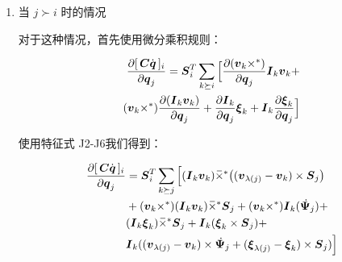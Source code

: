 \documentclass[letterpaper, 10 pt, conference]{ieeetran}  %
\begin{document}
{\begin{enumerate}
使用 $\B_{i}$ 的定义 (方程~\ref{bl_term_defn})，并对索引 $k$ 求和，我们得到：

   \begin{equation}
      \begin{aligned}
         \frac{\partial  [\,\C \qd\,]_{i}}{\partial \q_{j}} =     \Phibar_{i}^{T}  \Big[  2 \B_{i}^{C} \Psibardot_{j}  +\I_{i}^{C} \v_{\lambda(j)} \times \Psibardot_{j}   + \\
         \I_{i}^{C} \xibar_{\lambda(j)} \times \Phibar_{j}  \Big]  
        \label{partial_Cqdot_5}
      \end{aligned}
\end{equation}


 \item 当 $j \succ i $ 时的情况
 
 对于这种情况，首先使用微分乘积规则：
 
   \begin{equation}
      \begin{aligned}
        \frac{\partial  [\,\C \qd\,]_{i}}{\partial \q_{j}} =   \Phibar_{i}^{T}  \sum_{k \succeq i} \Big[\frac{\partial (\v_{k} \times^*)}{\partial \q_{j}} \I_{k} \v_{k} +\\
        (\v_{k} \times^*) \frac{\partial (\I_{k} \v_{k})}{\partial \q_{j}} +   \frac{\partial \I_{k} }{\partial \q_{j}} \xibar_{k} + \I_{k} \frac{\partial \xibar_{k} }{\partial \q_{j}} \Big]  
        \label{partial_Cqdot_6}
      \end{aligned}
\end{equation}
 
 使用特征式 J2-J6我们得到：
   
 
   \begin{equation}
      \begin{aligned}
         \frac{\partial  [\,\C \qd\,]_{i}}{\partial \q_{j}} &=        \Phibar_{i}^{T}  \sum_{k \succeq j} \Big[  (\I_{k} \v_{k}) \crff  \big( (\v_{\lambda(j)} - \v_{k} )  \times \Phibar_{j} \big )  \\&
         +(\v_{k} \times^*) (\I_{k} \v_{k}) \crff \Phibar_{j} + 
         (\v_{k} \times^*) \I_{k}(\Psibardot_{j})  + \\&
         (\I_{k} \xibar_{k} ) \crff \Phibar_{j} + 
         \I_{k}(\xibar_{k}  \times \Phibar_{j})  +  \\&
         \I_{k}( (\v_{\lambda(j)} - \v_{k} )  \times  \Psibardot_{j} + 
         ( \xibar_{\lambda(j)} - \xibar_{k} ) \times  \Phibar_{j}) \Big]  
        \label{partial_Cqdot_7}
      \end{aligned}
\end{equation}


\end{enumerate}}
\end{document}
